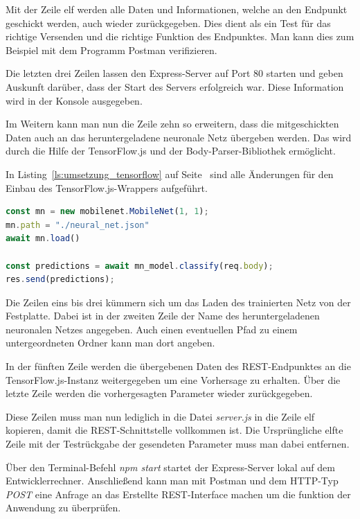 Mit der Zeile elf werden alle Daten und Informationen, welche an den Endpunkt geschickt werden, auch wieder zurückgegeben. 
Dies dient als ein Test für das richtige Versenden und die richtige Funktion des Endpunktes. Man kann dies zum Beispiel
mit dem Programm Postman verifizieren.

Die letzten drei Zeilen lassen den Express-Server auf Port 80 starten und geben Auskunft darüber, dass der Start des
Servers erfolgreich war. Diese Information wird in der Konsole ausgegeben.

Im Weitern kann man nun die Zeile zehn so erweitern, dass die mitgeschickten Daten auch an das heruntergeladene
neuronale Netz übergeben werden. Das wird durch die Hilfe der TensorFlow.js und der Body-Parser-Bibliothek ermöglicht.

In Listing~\ref{ls:umsetzung_tensorflow} auf Seite~\pageref{ls:umsetzung_tensorflow} sind alle Änderungen für den Einbau
des TensorFlow.js-Wrappers aufgeführt.

\begin{lstlisting}[language=JavaScript, caption=Der TensorFlow.js Programmteil, label=ls:umsetzung_tensorflow]
const mn = new mobilenet.MobileNet(1, 1);
mn.path = "./neural_net.json"
await mn.load()

const predictions = await mn_model.classify(req.body);
res.send(predictions);
\end{lstlisting}

Die Zeilen eins bis drei kümmern sich um das Laden des trainierten Netz von der Festplatte. Dabei ist in der zweiten
Zeile der Name des heruntergeladenen neuronalen Netzes angegeben. Auch einen eventuellen Pfad zu einem untergeordneten
Ordner kann man dort angeben.

In der fünften Zeile werden die übergebenen Daten des REST-Endpunktes an die TensorFlow.js-Instanz weitergegeben um eine
Vorhersage zu erhalten. Über die letzte Zeile werden die vorhergesagten Parameter wieder zurückgegeben.

Diese Zeilen muss man nun lediglich in die Datei \textit{server.js} in die Zeile elf kopieren, damit die REST-Schnittstelle
vollkommen ist. Die Ursprüngliche elfte Zeile mit der Testrückgabe der gesendeten Parameter muss man dabei entfernen.

Über den Terminal-Befehl \textit{npm start} startet der Express-Server lokal auf dem Entwicklerrechner. Anschließend
kann man mit Postman und dem HTTP-Typ \textit{POST} eine Anfrage an das Erstellte REST-Interface machen um die funktion
der Anwendung zu überprüfen.

